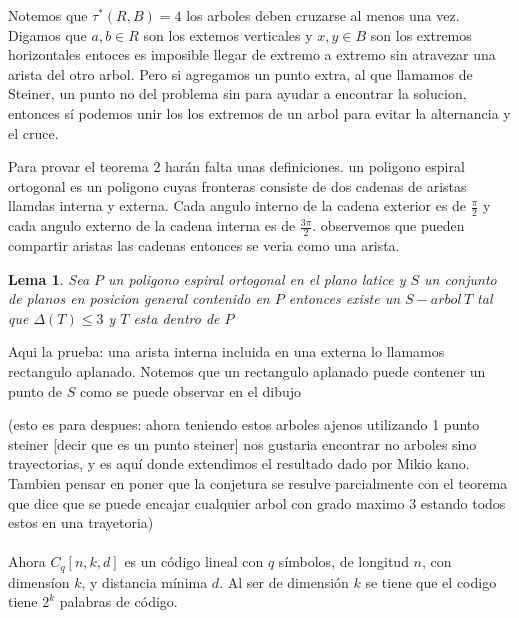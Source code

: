 \documentclass[11pt,a4paper]{article}
\newtheorem{lemma}{Lema}
\begin{document}
Notemos que $\tau^*(R, B) = 4$ los arboles deben cruzarse al menos una vez. Digamos que $a,b \in R$ son los extemos verticales y $x,y \in B$ son los extremos horizontales entoces es imposible llegar de extremo a extremo sin atravezar una arista del otro arbol. Pero si agregamos un punto extra, al que llamamos de Steiner, un punto no del problema sin para ayudar a encontrar la solucion, entonces sí podemos unir los los extremos de un arbol para evitar la alternancia y el cruce.

Para provar el teorema 2 harán falta unas definiciones. un poligono espiral ortogonal es un poligono cuyas fronteras consiste de dos cadenas de aristas llamdas interna y externa. Cada angulo interno de la cadena exterior es de $\frac{\pi }{2}$ y cada angulo externo de la cadena interna es de $\frac{3\pi }{2}$. observemos que pueden compartir aristas las cadenas entonces se veria como una arista.
\begin{lemma}
Sea $P$ un poligono espiral ortogonal en el plano latice y $S$ un conjunto de planos en posicion general contenido en $P$ entonces existe un $S-arbol \, T$  tal que $\Delta (T) \leq 3$ y $T$ esta dentro de $P$
\end{lemma}

Aqui la prueba: una arista interna incluida en una externa lo llamamos rectangulo aplanado. Notemos que un rectangulo aplanado puede contener un punto de $S$ como se puede observar en el dibujo


(esto es para despues: ahora teniendo estos arboles ajenos utilizando 1 punto steiner [decir que es un punto steiner] nos gustaria encontrar no arboles sino trayectorias, y es aquí donde extendimos el resultado dado por Mikio kano. Tambien pensar en poner que la conjetura se resulve parcialmente con el teorema que dice que se puede encajar cualquier arbol con grado maximo 3 estando todos estos en una trayetoria)
\\\\
Ahora $C_q[n,k,d]$ es un código lineal con $q$ símbolos, de longitud $n$, con dimensíon $k$, y distancia mínima $d$. 
Al ser de dimensión $k$ se tiene que el codigo tiene $2^{k}$ palabras de código.
\end{document}
